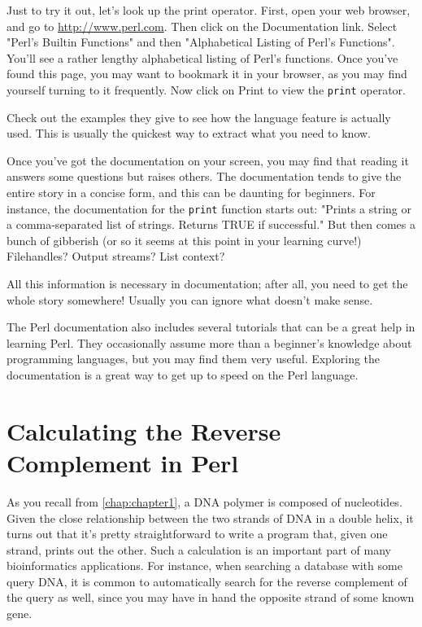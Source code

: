 Just to try it out, let's look up the print operator. First, open your web browser, and go to \href{http://www.perl.com}{http://www.perl.com}. Then click on the Documentation link. Select "Perl's Builtin Functions" and then "Alphabetical Listing of Perl's Functions". You'll see a rather lengthy alphabetical listing of Perl's functions. Once you've found this page, you may want to bookmark it in your browser, as you may find yourself turning to it frequently. Now click on Print to view the \verb|print| operator.

Check out the examples they give to see how the language feature is actually used. This is usually the quickest way to extract what you need to know.

Once you've got the documentation on your screen, you may find that reading it answers some questions but raises others. The documentation tends to give the entire story in a concise form, and this can be daunting for beginners. For instance, the documentation for the \verb|print| function starts out: "Prints a string or a comma-separated list of strings. Returns TRUE if successful." But then comes a bunch of gibberish (or so it seems at this point in your learning curve!) Filehandles? Output streams? List context?

All this information is necessary in documentation; after all, you need to get the whole story somewhere! Usually you can ignore what doesn't make sense.

The Perl documentation also includes several tutorials that can be a great help in learning Perl. They occasionally assume more than a beginner's knowledge about programming languages, but you may find them very useful. Exploring the documentation is a great way to get up to speed on the Perl language. 

\section{Calculating the Reverse Complement in Perl}
As you recall from \autoref{chap:chapter1}, a DNA polymer is composed of nucleotides.  Given the close relationship between the two strands of DNA in a double helix, it turns out that it's pretty straightforward to write a program that, given one strand, prints out the other. Such a calculation is an important part of many bioinformatics applications. For instance, when searching a database with some query DNA, it is common to automatically search for the reverse complement of the query as well, since you may have in hand the opposite strand of some known gene.

